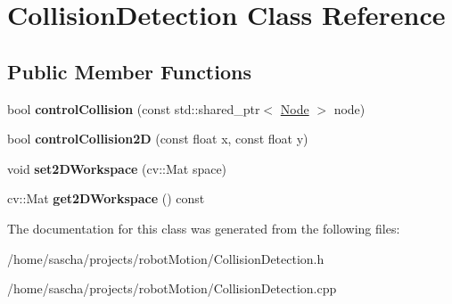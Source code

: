 \hypertarget{class_collision_detection}{\section{Collision\-Detection Class Reference}
\label{class_collision_detection}
}
\subsection*{Public Member Functions}
\begin{DoxyCompactItemize}
\item 
\hypertarget{class_collision_detection_a3034baabebcbc46c25cf02b811aa1500}{bool {\bfseries control\-Collision} (const std\-::shared\-\_\-ptr$<$ \hyperlink{class_node}{Node} $>$ node)}\label{class_collision_detection_a3034baabebcbc46c25cf02b811aa1500}

\item 
\hypertarget{class_collision_detection_a8df29ec9271c2d49a9c8d4c502cdb531}{bool {\bfseries control\-Collision2\-D} (const float x, const float y)}\label{class_collision_detection_a8df29ec9271c2d49a9c8d4c502cdb531}

\item 
\hypertarget{class_collision_detection_acd6266ee643d89dcbabb19e8252a6cd9}{void {\bfseries set2\-D\-Workspace} (cv\-::\-Mat space)}\label{class_collision_detection_acd6266ee643d89dcbabb19e8252a6cd9}

\item 
\hypertarget{class_collision_detection_a0f9a583abbcfe9e6cb4f1062312bfb2b}{cv\-::\-Mat {\bfseries get2\-D\-Workspace} () const }\label{class_collision_detection_a0f9a583abbcfe9e6cb4f1062312bfb2b}

\end{DoxyCompactItemize}


The documentation for this class was generated from the following files\-:\begin{DoxyCompactItemize}
\item 
/home/sascha/projects/robot\-Motion/Collision\-Detection.\-h\item 
/home/sascha/projects/robot\-Motion/Collision\-Detection.\-cpp\end{DoxyCompactItemize}
